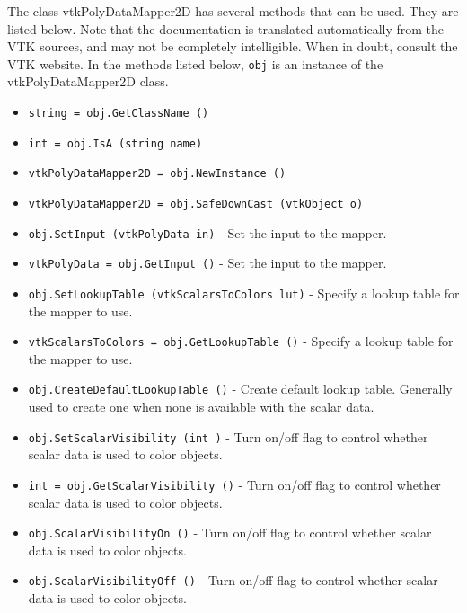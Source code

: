 The class vtkPolyDataMapper2D has several methods that can be used.
  They are listed below.
Note that the documentation is translated automatically from the VTK sources,
and may not be completely intelligible.  When in doubt, consult the VTK website.
In the methods listed below, \verb|obj| is an instance of the vtkPolyDataMapper2D class.
\begin{itemize}
\item  \verb|string = obj.GetClassName ()|

\item  \verb|int = obj.IsA (string name)|

\item  \verb|vtkPolyDataMapper2D = obj.NewInstance ()|

\item  \verb|vtkPolyDataMapper2D = obj.SafeDownCast (vtkObject o)|

\item  \verb|obj.SetInput (vtkPolyData in)| -  Set the input to the mapper.  

\item  \verb|vtkPolyData = obj.GetInput ()| -  Set the input to the mapper.  

\item  \verb|obj.SetLookupTable (vtkScalarsToColors lut)| -  Specify a lookup table for the mapper to use.

\item  \verb|vtkScalarsToColors = obj.GetLookupTable ()| -  Specify a lookup table for the mapper to use.

\item  \verb|obj.CreateDefaultLookupTable ()| -  Create default lookup table. Generally used to create one when none
 is available with the scalar data.

\item  \verb|obj.SetScalarVisibility (int )| -  Turn on/off flag to control whether scalar data is used to color objects.

\item  \verb|int = obj.GetScalarVisibility ()| -  Turn on/off flag to control whether scalar data is used to color objects.

\item  \verb|obj.ScalarVisibilityOn ()| -  Turn on/off flag to control whether scalar data is used to color objects.

\item  \verb|obj.ScalarVisibilityOff ()| -  Turn on/off flag to control whether scalar data is used to color objects.


\end{itemize}
